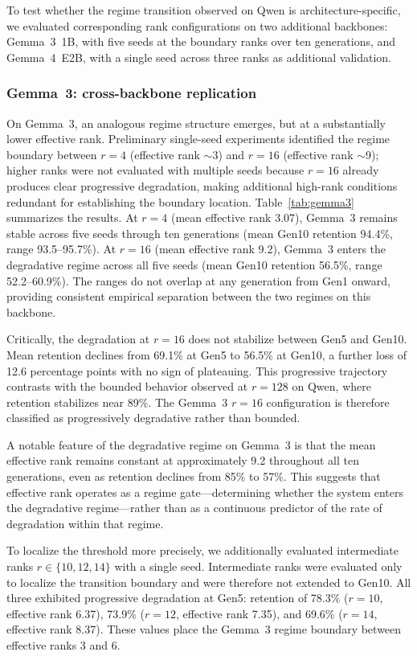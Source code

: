 \documentclass[a4paper,fleqn]{cas-dc}
\begin{document}
To test whether the regime transition observed on Qwen is architecture-specific,
we evaluated corresponding rank configurations on two additional backbones:
Gemma~3~1B, with five seeds at the boundary ranks over ten generations, and
Gemma~4~E2B, with a single seed across three ranks as additional validation.

\subsubsection{Gemma~3: cross-backbone replication}

On Gemma~3, an analogous regime structure emerges, but at a substantially lower
effective rank. Preliminary single-seed experiments identified the regime
boundary between $r=4$ (effective rank ${\sim}$3) and $r=16$ (effective rank
${\sim}$9); higher ranks were not evaluated with multiple seeds because $r=16$
already produces clear progressive degradation, making additional high-rank
conditions redundant for establishing the boundary location.
Table~\ref{tab:gemma3} summarizes the results. At $r=4$ (mean
effective rank 3.07), Gemma~3 remains stable across five seeds through ten
generations (mean Gen10 retention 94.4\%, range 93.5--95.7\%). At $r=16$ (mean
effective rank 9.2), Gemma~3 enters the degradative regime across all five
seeds (mean Gen10 retention 56.5\%, range 52.2--60.9\%). The ranges do not
overlap at any generation from Gen1 onward, providing consistent empirical
separation between the two regimes on this backbone.

Critically, the degradation at $r=16$ does not stabilize between Gen5 and
Gen10. Mean retention declines from 69.1\% at Gen5 to 56.5\% at Gen10, a
further loss of 12.6 percentage points with no sign of plateauing. This
progressive trajectory contrasts with the bounded behavior observed at $r=128$
on Qwen, where retention stabilizes near 89\%. The Gemma~3 $r=16$
configuration is therefore classified as progressively degradative rather than
bounded.

A notable feature of the degradative regime on Gemma~3 is that the mean
effective rank remains constant at approximately 9.2 throughout all ten
generations, even as retention declines from 85\% to 57\%. This suggests that
effective rank operates as a regime gate---determining whether the system
enters the degradative regime---rather than as a continuous predictor of the
rate of degradation within that regime.

To localize the threshold more precisely, we additionally evaluated intermediate
ranks $r \in \{10, 12, 14\}$ with a single seed. Intermediate ranks were
evaluated only to localize the transition boundary and were therefore not
extended to Gen10. All three exhibited progressive
degradation at Gen5: retention of 78.3\% ($r=10$, effective rank 6.37), 73.9\%
($r=12$, effective rank 7.35), and 69.6\% ($r=14$, effective rank 8.37). These
values place the Gemma~3 regime boundary between effective ranks 3 and 6.
\end{document}
